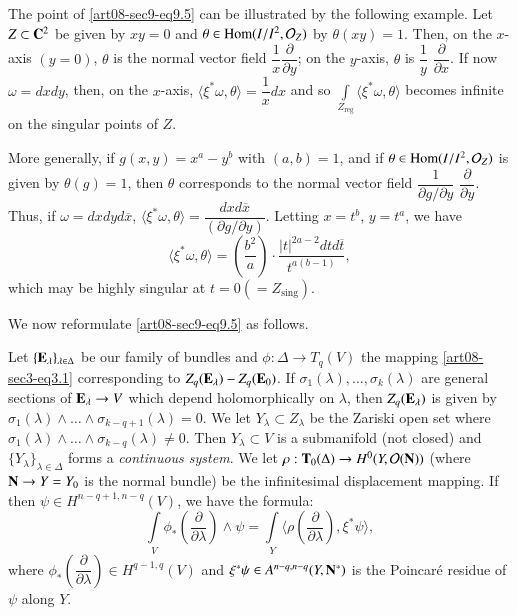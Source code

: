 \begin{example*}
The point of \eqref{art08-sec9-eq9.5} can be illustrated by the following example. Let $Z\subset \mathbf{C}^{2}$ be given by $xy=0$ and $\theta\in \operatorname{\mathrm{Hom}}(I/I^{2},\mathcal{O}_{Z})$ by $\theta(xy)=1$. Then, on the $x$-axis $(y=0)$, $\theta$ is the normal vector field $\dfrac{1}{x}\dfrac{\partial}{\partial y}$; on the $y$-axis, $\theta$ is $\dfrac{1}{y}$ $\dfrac{\partial}{\partial x}$. If now $\omega=dxdy$, then, on the $x$-axis, $\langle \xi^{*}\omega,\theta\rangle=\dfrac{1}{x}dx$ and so $\int\limits_{Z_{\text{reg}}}\langle \xi^{*}\omega,\theta\rangle$ becomes infinite on the singular points of $Z$.
\end{example*}

More generally, if $g(x,y)=x^{a}-y^{b}$ with $(a,b)=1$, and if $\theta\in \operatorname{\mathrm{Hom}}(I/I^{2},\mathcal{O}_{Z})$ is given by $\theta(g)=1$, then $\theta$ corresponds to the normal vector field $\dfrac{1}{\partial g/\partial y}$ $\dfrac{\partial}{\partial y}$. Thus, if $\omega = dxdyd\overline{x}$, $\langle \xi^{*}\omega,\theta\rangle=\dfrac{dxd\overline{x}}{(\partial g/\partial y)}$. Letting $x=t^{b}$, $y=t^{a}$, we have
$$
\langle \xi^{*}\omega,\theta\rangle =\left(\dfrac{b^{2}}{a}\right)\cdot \dfrac{|t|^{2a-2}dtd\overline{t}}{t^{a(b-1)}},
$$\pageoriginale
which may be highly singular at $t=0(=Z_{\text{sing}})$.

We now reformulate \eqref{art08-sec9-eq9.5} as follows.

Let $\{\mathbf{E}_{\lambda}\}_{\lambda\in \Delta}$ be our family of bundles and $\phi:\Delta\to T_{q}(V)$ the mapping \eqref{art08-sec3-eq3.1} corresponding to $Z_{q}(\mathbf{E}_{\lambda})-Z_{q}(\mathbf{E}_{0})$. If $\sigma_{1}(\lambda),\ldots,\sigma_{k}(\lambda)$ are general sections of $\mathbf{E}_{\lambda}\to V$ which depend holomorphically on $\lambda$, then $Z_{q}(\mathbf{E}_{\lambda})$ is given by $\sigma_{1}(\lambda)\wedge\ldots\wedge \sigma_{k-q+1}(\lambda)=0$. We let $Y_{\lambda}\subset Z_{\lambda}$ be the Zariski open set where $\sigma_{1}(\lambda)\wedge\ldots\wedge \sigma_{k-q}(\lambda)\neq 0$. Then $Y_{\lambda}\subset V$ is a submanifold (not closed) and $\{Y_{\lambda}\}_{\lambda\in \Delta}$ forms a {\em continuous system}. We let $\rho:\mathbf{T}_{0}(\Delta)\to H^{0}(Y,\mathcal{O}(\mathbf{N}))$ (where $\mathbf{N}\to Y=Y_{0}$ is the normal bundle) be the infinitesimal displacement mapping. If then $\psi\in H^{n-q+1,n-q}(V)$, we have the formula:
\begin{equation*}
\int\limits_{V}\phi_{*}\left(\dfrac{\partial}{\partial\lambda}\right)\wedge\psi=\int\limits_{Y}\langle \rho\left(\dfrac{\partial}{\partial\lambda}\right),\xi^{*}\psi\rangle,\tag{9.8}\label{art08-sec9-eq9.8}
\end{equation*}
where $\phi_{*}\left(\dfrac{\partial}{\partial\lambda}\right)\in H^{q-1,q}(V)$ and $\xi^{*}\psi\in A^{n-q,n-q}(Y,\mathbf{N}^{*})$ is the Poincar\'e residue of $\psi$ along $Y$.

